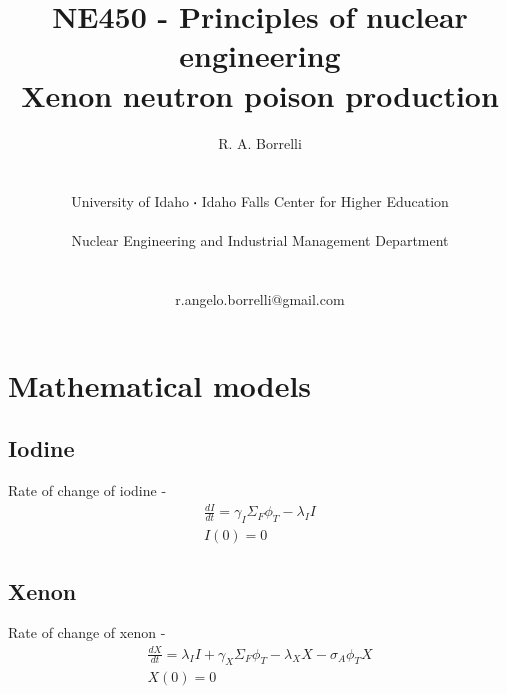 \documentclass[11pt,a4paper]{article}
\newcommand*\sq{\mathbin{\vcenter{\hbox{\rule{.3ex}{.3ex}}}}} %
\begin{document}
\begin{titlepage}
    \title{
        NE450 - Principles of nuclear engineering\\
        Xenon neutron poison production\\
    }
    \author{
        R. A. Borrelli
        \\ \\ \\
        University of Idaho $\sq$ Idaho Falls Center for Higher Education
        \\ \\
        Nuclear Engineering and Industrial Management Department
        \\ \\ \\
        r.angelo.borrelli@gmail.com
    }
\clearpage %
\maketitle
\thispagestyle{empty} %
\end{titlepage}

\section{Mathematical models}
\subsection{Iodine}
\noindent Rate of change of iodine - 
\begin{equation} \label{eq-i-dq}
    \begin{gathered}
        \frac{dI}{dt}=\gamma_I \Sigma_F \phi_T-\lambda_I I \\
        I(0)=0
    \end{gathered}
\end{equation}

\subsection{Xenon}
\noindent Rate of change of xenon - 
\begin{equation} \label{eq-xe-dq}
    \begin{gathered}
        \frac{dX}{dt}=\lambda_I I + \gamma_X \Sigma_F \phi_T - \lambda_X X - \sigma_A \phi_T X \\
        X(0)=0
    \end{gathered}
\end{equation}
\end{document}
